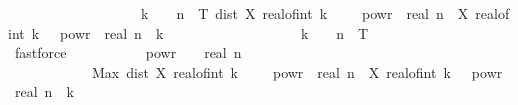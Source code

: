 \begin{isabellebody}
\ \ \ \ \ \ \ \ \ \ \ \ \ \ \ \ \ \ \ k\ {\isasymin}\ {\isacharbraceleft}{\kern0pt}{}{\isachardot}{\kern0pt}{\isachardot}{\kern0pt}{\isasymlfloor}{}\ {\isacharcircum}{\kern0pt}\ n\ {\isacharasterisk}{\kern0pt}\ T{\isasymrfloor}{\isacharbraceright}{\kern0pt}{\isacharbraceright}{\kern0pt}{\isachardoublequoteclose}\ {\isachardoublequoteopen}{\isacharbraceleft}{\kern0pt}dist\ {\isacharparenleft}{\kern0pt}X\ {\isacharparenleft}{\kern0pt}real{\isacharunderscore}{\kern0pt}of{\isacharunderscore}{\kern0pt}int\ {\isacharparenleft}{\kern0pt}k\ {\isacharminus}{\kern0pt}\ {}{\isacharparenright}{\kern0pt}\ {\isacharasterisk}{\kern0pt}\ {}\ powr\ {\isacharminus}{\kern0pt}\ real\ n{\isacharparenright}{\kern0pt}\ {\isasymomega}{\isacharparenright}{\kern0pt}\ {\isacharparenleft}{\kern0pt}X\ {\isacharparenleft}{\kern0pt}real{\isacharunderscore}{\kern0pt}of{\isacharunderscore}{\kern0pt}int\ k\ {\isacharasterisk}{\kern0pt}\ {}\ powr\ {\isacharminus}{\kern0pt}\ real\ n{\isacharparenright}{\kern0pt}\ {\isasymomega}{\isacharparenright}{\kern0pt}\ {\isacharbar}{\kern0pt}k{\isachardot}{\kern0pt}\isanewline
\ \ \ \ \ \ \ \ \ \ \ \ \ \ \ \ \ \ \ k\ {\isasymin}\ {\isacharbraceleft}{\kern0pt}{}{\isachardot}{\kern0pt}{\isachardot}{\kern0pt}{\isasymlfloor}{}\ {\isacharcircum}{\kern0pt}\ n\ {\isacharasterisk}{\kern0pt}\ T{\isasymrfloor}{\isacharbraceright}{\kern0pt}{\isacharbraceright}{\kern0pt}\ {\isasymnoteq}\ {\isacharbraceleft}{\kern0pt}{\isacharbraceright}{\kern0pt}{\isachardoublequoteclose}\isanewline
\ \ \ \ \ \ \ \ \ \ \isamarkupfalse%
\ fastforce{\isacharplus}{\kern0pt}\isanewline
\ \ \ \ \ \ \ \ \isamarkupfalse%
\ {\isachardoublequoteopen}{}\ powr\ {\isacharparenleft}{\kern0pt}{\isacharminus}{\kern0pt}\ {\isasymgamma}\ {\isacharasterisk}{\kern0pt}\ real\ n{\isacharparenright}{\kern0pt}\isanewline
\ \ \ \ \ \ \ \ \ \ \ {\isachargreater}{\kern0pt}\ Max\ {\isacharbraceleft}{\kern0pt}dist\ {\isacharparenleft}{\kern0pt}X\ {\isacharparenleft}{\kern0pt}real{\isacharunderscore}{\kern0pt}of{\isacharunderscore}{\kern0pt}int\ {\isacharparenleft}{\kern0pt}k\ {\isacharminus}{\kern0pt}\ {}{\isacharparenright}{\kern0pt}\ {\isacharasterisk}{\kern0pt}\ {}\ powr\ {\isacharminus}{\kern0pt}\ real\ n{\isacharparenright}{\kern0pt}\ {\isasymomega}{\isacharparenright}{\kern0pt}\ {\isacharparenleft}{\kern0pt}X\ {\isacharparenleft}{\kern0pt}real{\isacharunderscore}{\kern0pt}of{\isacharunderscore}{\kern0pt}int\ k\ {\isacharasterisk}{\kern0pt}\ {}\ powr\ {\isacharminus}{\kern0pt}\ real\ n{\isacharparenright}{\kern0pt}\ {\isasymomega}{\isacharparenright}{\kern0pt}\ {\isacharbar}{\kern0pt}k{\isachardot}{\kern0pt}\isanewline

\end{isabellebody}
